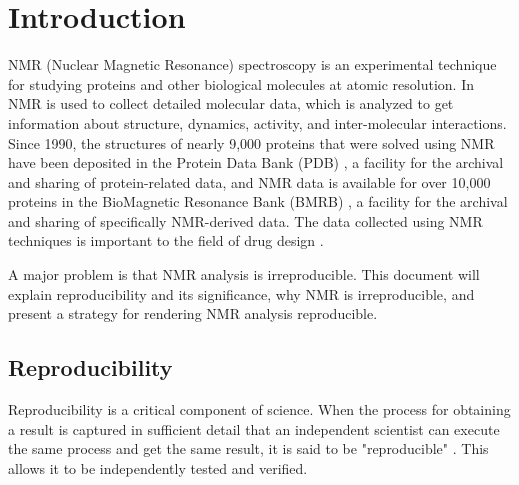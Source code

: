\chapter{Introduction}

NMR (Nuclear Magnetic Resonance) spectroscopy is an experimental technique for 
studying proteins and other biological molecules at atomic resolution.  In 
NMR is used to collect detailed molecular data, which 
is analyzed to get information about structure, dynamics,  
activity, and inter-molecular interactions.  
Since 1990, the structures of nearly 9,000 
proteins that were solved using NMR have been deposited in the Protein Data 
Bank (PDB) \cite{pdb}, a facility for the archival and sharing of protein-related 
data, and NMR data is available for over 10,000 proteins in the BioMagnetic 
Resonance Bank (BMRB) \cite{bmrb}, a facility for the archival and sharing of 
specifically NMR-derived data.  The data collected using NMR techniques is 
important to the field of drug design 
\cite{stockman2002drugs, moore2003leveraging, reckel2011proteorhodopsin}.

A major problem is that NMR analysis is irreproducible.  This document will
explain reproducibility and its significance, why NMR is irreproducible,
and present a strategy for rendering NMR analysis reproducible.



\section{Reproducibility}
Reproducibility is a critical component of science.
When the process for obtaining a result is captured in sufficient detail that
an independent scientist can execute the same process and get the same result,
it is said to be "reproducible" \cite{russell2013reproducibility, nih2014reproducibility}.
This allows it to be independently tested and verified.

